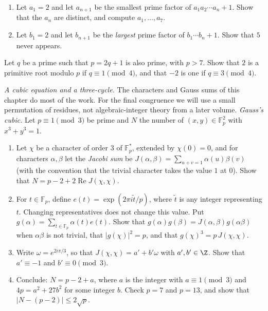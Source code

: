 \begin{exercise}[$\star\star$]\label{pb:mullin}
\begin{enumerate}[label=(\alph*)]
\item Let $a_1=2$ and let $a_{n+1}$ be the smallest prime factor of $a_1a_2\cdots a_n+1$. Show that the $a_n$ are distinct, and
compute $a_1,\dots,a_7$.
\item Let $b_1=2$ and let $b_{n+1}$ be the \emph{largest} prime factor of $b_1\cdots b_n+1$. Show that $5$ never appears.
\end{enumerate}
\end{exercise}

\begin{exercise}[$\star\star$]\label{pb:artin}
Let $q$ be a prime such that $p=2q+1$ is also prime, with $p>7$. Show that $2$ is a primitive root modulo $p$ if
$q\equiv1\pmod4$, and that $-2$ is one if $q\equiv3\pmod4$.
\end{exercise}

\begin{exercise}[$\star\star\star$]\label{pb:fermatcubic}
\emph{A cubic equation and a three-cycle.}
The characters and Gauss sums of this chapter do most of the work.
For the final congruence we will use a small permutation of residues,
not algebraic-integer theory from a later volume.
\emph{Gauss's cubic.} Let $p\equiv1\pmod3$ be prime and $N$ the number of $(x,y)\in\mathbb F_p^2$ with $x^3+y^3=1$.
\begin{enumerate}[label=(\alph*)]
\item Let $\chi$ be a character of order $3$ of $\mathbb F_p^*$, extended by $\chi(0)=0$, and for characters $\alpha,\beta$
let the \emph{Jacobi sum} be $J(\alpha,\beta)=\sum_{u+v=1}\alpha(u)\beta(v)$ (with the convention that the trivial character takes the value $1$ at $0$).
Show that $N=p-2+2\operatorname{Re}J(\chi,\chi)$.
\item For $t\in\mathbb F_p$, define $e(t)=\exp(2\pi i\widetilde t/p)$, where $\widetilde t$ is any integer representing $t$. Changing representatives does not change this value. Put $g(\alpha)=\sum_{t\in\mathbb F_p}\alpha(t)e(t)$. Show that $g(\alpha)g(\beta)=J(\alpha,\beta)g(\alpha\beta)$ when
$\alpha\beta$ is not trivial, that $|g(\chi)|^2=p$, and that $g(\chi)^3=p\,J(\chi,\chi)$.
\item Write $\omega=e^{2i\pi/3}$, so that $J(\chi,\chi)=a'+b'\omega$ with $a',b'\in\Z$. Show that $a'\equiv-1$ and
$b'\equiv0\pmod 3$.
\item Conclude: $N=p-2+a$, where $a$ is the integer with $a\equiv1\pmod3$ and $4p=a^2+27b^2$ for some integer $b$. Check $p=7$
and $p=13$, and show that $|N-(p-2)|\le2\sqrt p$.
\end{enumerate}
\end{exercise}

